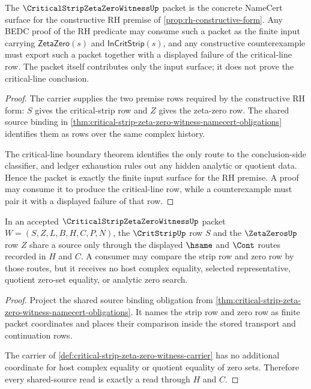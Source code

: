 \begin{theorem}
\label{thm:critical-strip-zeta-zero-witness-concretizes-rh}
The $\CriticalStripZetaZeroWitnessUp$ packet is the concrete NameCert surface for the constructive RH premise of \autoref{prop:rh-constructive-form}. Any BEDC proof of the RH predicate may consume such a packet as the finite input carrying $\mathsf{ZetaZero}(s)$ and $\mathsf{InCritStrip}(s)$, and any constructive counterexample must export such a packet together with a displayed failure of the critical-line row. The packet itself contributes only the input surface; it does not prove the critical-line conclusion.
\end{theorem}
\begin{proof}
The carrier supplies the two premise rows required by the constructive RH form: $S$ gives the critical-strip row and $Z$ gives the zeta-zero row. The shared source binding in \autoref{thm:critical-strip-zeta-zero-witness-namecert-obligations} identifies them as rows over the same complex history.

The critical-line boundary theorem identifies the only route to the conclusion-side classifier, and ledger exhaustion rules out any hidden analytic or quotient data. Hence the packet is exactly the finite input surface for the RH premise. A proof may consume it to produce the critical-line row, while a counterexample must pair it with a displayed failure of that row.
\end{proof}

\begin{theorem}
\label{thm:critical-strip-zeta-zero-shared-source-scope}
In an accepted $\CriticalStripZetaZeroWitnessUp$ packet $W=(S,Z,L,B,H,C,P,N)$, the $\CritStripUp$ row $S$ and the $\ZetaZerosUp$ row $Z$ share a source only through the displayed $\hsame$ and $\Cont$ routes recorded in $H$ and $C$. A consumer may compare the strip row and zero row by those routes, but it receives no host complex equality, selected representative, quotient zero-set equality, or analytic zero search.
\end{theorem}
\begin{proof}
Project the shared source binding obligation from \autoref{thm:critical-strip-zeta-zero-witness-namecert-obligations}. It names the strip row and zero row as finite packet coordinates and places their comparison inside the stored transport and continuation rows.

The carrier of \autoref{def:critical-strip-zeta-zero-witness-carrier} has no additional coordinate for host complex equality or quotient equality of zero sets. Therefore every shared-source read is exactly a read through $H$ and $C$.
\end{proof}

